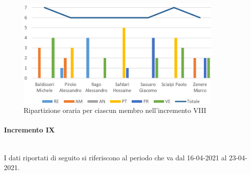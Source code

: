 \begin{figure}[!htb]   
    \centering
    \includegraphics[width=0.90\textwidth]{Images/prev8}
	\caption{Ripartizione oraria per ciascun membro nell'incremento VIII}
\end{figure}

\paragraph{Incremento IX}\mbox{}\\
I dati riportati di seguito si riferiscono al periodo che va dal 16-04-2021 al 23-04-2021.


